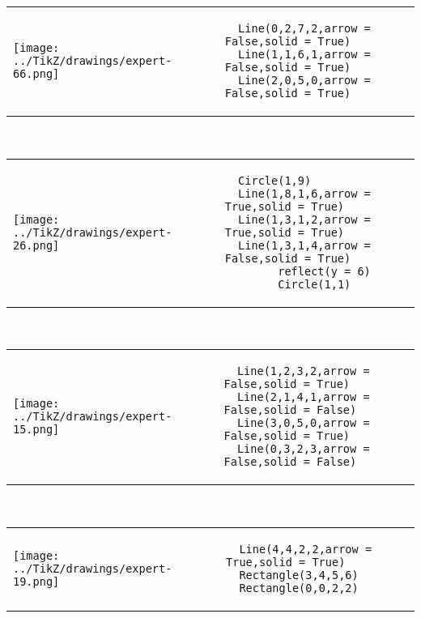         \begin{tabular}{ll}
\texttt{[image: ../TikZ/drawings/expert-66.png]}&
        \begin{minipage}{10cm}
        \begin{verbatim}
  Line(0,2,7,2,arrow = False,solid = True)
  Line(1,1,6,1,arrow = False,solid = True)
  Line(2,0,5,0,arrow = False,solid = True)
        \end{verbatim}
\end{minipage}
\end{tabular}        
        \\

        \begin{tabular}{ll}
\texttt{[image: ../TikZ/drawings/expert-26.png]}&
        \begin{minipage}{10cm}
        \begin{verbatim}
  Circle(1,9)
  Line(1,8,1,6,arrow = True,solid = True)
  Line(1,3,1,2,arrow = True,solid = True)
  Line(1,3,1,4,arrow = False,solid = True)
        reflect(y = 6)
        Circle(1,1)
        \end{verbatim}
\end{minipage}
\end{tabular}        
        \\

        \begin{tabular}{ll}
\texttt{[image: ../TikZ/drawings/expert-15.png]}&
        \begin{minipage}{10cm}
        \begin{verbatim}
  Line(1,2,3,2,arrow = False,solid = True)
  Line(2,1,4,1,arrow = False,solid = False)
  Line(3,0,5,0,arrow = False,solid = True)
  Line(0,3,2,3,arrow = False,solid = False)
        \end{verbatim}
\end{minipage}
\end{tabular}        
        \\

        \begin{tabular}{ll}
\texttt{[image: ../TikZ/drawings/expert-19.png]}&
        \begin{minipage}{10cm}
        \begin{verbatim}
  Line(4,4,2,2,arrow = True,solid = True)
  Rectangle(3,4,5,6)
  Rectangle(0,0,2,2)
        \end{verbatim}
\end{minipage}
\end{tabular}        
        \\

